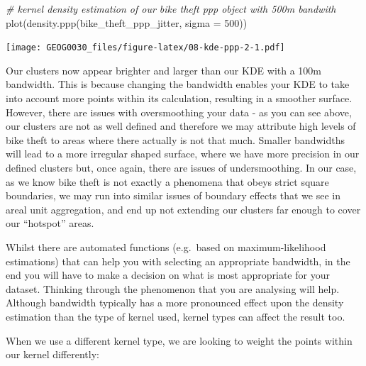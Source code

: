 \documentclass[
]{book}
\newenvironment{Shaded}{\begin{snugshade}}{\end{snugshade}}
\newcommand{\AttributeTok}[1]{\textcolor[rgb]{0.77,0.63,0.00}{#1}}
\newcommand{\CommentTok}[1]{\textcolor[rgb]{0.56,0.35,0.01}{\textit{#1}}}
\newcommand{\DecValTok}[1]{\textcolor[rgb]{0.00,0.00,0.81}{#1}}
\newcommand{\FunctionTok}[1]{\textcolor[rgb]{0.00,0.00,0.00}{#1}}
\newcommand{\NormalTok}[1]{#1}
\begin{document}
\begin{Shaded}
\begin{Highlighting}[]
\CommentTok{\# kernel density estimation of our bike theft ppp object with 500m bandwith}
\FunctionTok{plot}\NormalTok{(}\FunctionTok{density.ppp}\NormalTok{(bike\_theft\_ppp\_jitter, }\AttributeTok{sigma =} \DecValTok{500}\NormalTok{))}
\end{Highlighting}
\end{Shaded}

\texttt{[image: GEOG0030\_files/figure-latex/08-kde-ppp-2-1.pdf]}

Our clusters now appear brighter and larger than our KDE with a 100m bandwidth. This is because changing the bandwidth enables your KDE to take into account more points within its calculation, resulting in a smoother surface. However, there are issues with oversmoothing your data - as you can see above, our clusters are not as well defined and therefore we may attribute high levels of bike theft to areas where there actually is not that much. Smaller bandwidths will lead to a more irregular shaped surface, where we have more precision in our defined clusters but, once again, there are issues of undersmoothing. In our case, as we know bike theft is not exactly a phenomena that obeys strict square boundaries, we may run into similar issues of boundary effects that we see in areal unit aggregation, and end up not extending our clusters far enough to cover our ``hotspot'' areas.

Whilst there are automated functions (e.g.~based on maximum-likelihood estimations) that can help you with selecting an appropriate bandwidth, in the end you will have to make a decision on what is most appropriate for your dataset. Thinking through the phenomenon that you are analysing will help. Although bandwidth typically has a more pronounced effect upon the density estimation than the type of kernel used, kernel types can affect the result too.

When we use a different kernel type, we are looking to weight the points within our kernel differently:
\end{document}
